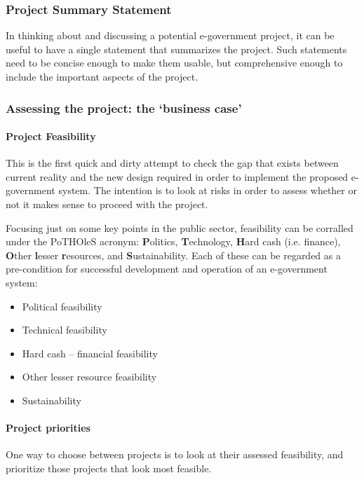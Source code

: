\subsubsection{Project Summary Statement}
In thinking about and discussing a potential e-government project, it can be useful
to have a single statement that summarizes
the project. Such statements need to be
concise enough to make them usable, but
comprehensive enough to include the
important aspects of the project.

\subsubsection{Assessing the project: the ‘business case’}

\paragraph*{Project Feasibility}
This is the first quick and dirty attempt to
check the gap that exists between current
reality and the new design required in order
to implement the proposed e-government
system. The intention is to look at risks in
order to assess whether or not it makes
sense to proceed with the project.

Focusing just on some key
points in the public sector, feasibility can be
corralled under the PoTHOleS acronym:
\textbf{P}olitics, \textbf{T}echnology, \textbf{H}ard cash (i.e. finance),
\textbf{O}ther \textbf{l}esser \textbf{r}esources, and \textbf{S}ustainability. Each
of these can be regarded as a pre-condition
for successful development and operation of
an e-government system:
\begin{multicols}{2}
	\begin{itemize}
		\item Political feasibility
		\item Technical feasibility
		\item Hard cash – financial feasibility
		\item Other lesser resource feasibility
		\item Sustainability
	\end{itemize}
\end{multicols}


\paragraph*{Project priorities}
One way to choose between projects is to
look at their assessed feasibility, and prioritize
those projects that look most feasible.

